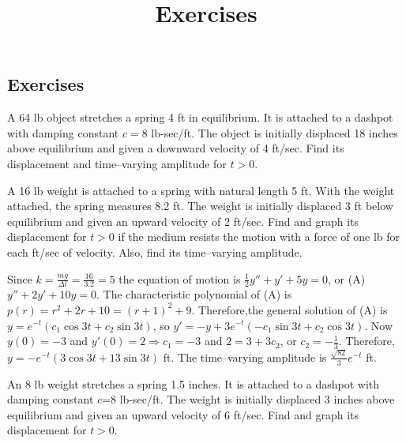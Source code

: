 \documentclass{ximera}
\title{Exercises} \license{CC BY-NC-SA 4.0}
\begin{document}
\begin{abstract}
\end{abstract}
\maketitle

\begin{onlineOnly}
\section*{Exercises}
\end{onlineOnly}

\begin{problem}\label{exer:6.2.1}
A 64 lb object stretches a spring 4 ft in equilibrium. It is attached
to a dashpot with damping constant $c=8$ lb-sec/ft. The object is
initially displaced 18 inches above equilibrium and given a downward
velocity of 4 ft/sec. Find its displacement and time--varying
amplitude for $t>0$.
\end{problem}

\begin{problem}\label{exer:6.2.2}  
A 16 lb weight is attached to a spring with natural length 5 ft. With
the weight attached, the spring measures 8.2 ft. The weight is
initially displaced 3 ft below equilibrium and given an upward
velocity of 2 ft/sec. Find and graph its displacement
 for $t>0$ if the medium resists the motion with a force of
one lb for each ft/sec of velocity. Also, find its time--varying amplitude.

\begin{solution}
    Since $k=\frac{mg}{\Delta l}=\frac{16}{3.2}=5$ the equation of
motion is $\frac{1}{2}y''+y'+5y=0$, or (A) $y''+2y'+10y=0$. The
characteristic polynomial of (A) is $p(r)=r^2+2r+10=(r+1)^2+9$.
Therefore,the general solution of (A) is
$y=e^{-t}(c_1\cos3t+c_2\sin3t)$, so
$y'=-y+3e^{-t}(-c_1\sin3t+c_2\cos3t)$. Now $y(0)=-3$ and
$y'(0)=2\Rightarrow c_1=-3$ and $2=3+3c_2$, or $c_2=-\frac{1}{3}$.
Therefore,$y=-e^{-t}\left(3\cos3t+{1}{3}\sin3t\right)$ ft.
The time--varying amplitude is $\frac{\sqrt{82}}{3}e^{-t}$ ft.
\end{solution}
\end{problem}

\begin{problem}\label{exer:6.2.3}  
An 8 lb weight stretches a spring 1.5 inches. It is attached to a
dashpot with damping constant $c$=8 lb-sec/ft. The weight is
initially displaced 3 inches above equilibrium and given an upward
velocity of 6 ft/sec. Find and graph its displacement for $t>0$.
\end{problem}
\end{document}
